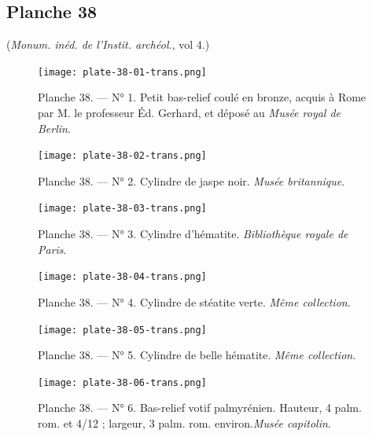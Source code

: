 \documentclass[a4paper, 11pt, oneside, polutonikogreek, french]{article}
\begin{document}
\subsection{Planche 38}
\begin{center}
(\emph{Monum. inéd. de l'Instit. archéol.}, vol 4.)
\end{center}
\vspace*{\fill}
\clearpage
\pagestyle{fancy}
\fancyhf{}
\cfoot{{\scriptsize\bfseries\thepage}}
\vspace*{\fill}
\begin{figure}[H]
\centering
\texttt{[image: plate-38-01-trans.png]}
\caption{\scriptsize Planche 38. --- N° 1. Petit bas-relief coulé en bronze, acquis à Rome par M. le professeur Éd. Gerhard, et déposé au \emph{Musée royal de Berlin}.}
\end{figure}
\vspace*{\fill}
\clearpage
\vspace*{\fill}
\begin{figure}[H]
\centering
\texttt{[image: plate-38-02-trans.png]}
\caption{\scriptsize Planche 38. --- N° 2. Cylindre de jaspe noir. \emph{Musée britannique}.}
\end{figure}
\vspace*{\fill}
\clearpage
\vspace*{\fill}
\begin{figure}[H]
\centering
\texttt{[image: plate-38-03-trans.png]}
\caption{\scriptsize Planche 38. --- N° 3. Cylindre d'hématite. \emph{Bibliothèque royale de Paris}.}
\end{figure}
\vspace*{\fill}
\clearpage
\vspace*{\fill}
\begin{figure}[H]
\centering
\texttt{[image: plate-38-04-trans.png]}
\caption{\scriptsize Planche 38. --- N° 4. Cylindre de stéatite verte. \emph{Même collection}.}
\end{figure}
\vspace*{\fill}
\clearpage
\vspace*{\fill}
\begin{figure}[H]
\centering
\texttt{[image: plate-38-05-trans.png]}
\caption{\scriptsize Planche 38. --- N° 5. Cylindre de belle hématite. \emph{Même collection}.}
\end{figure}
\vspace*{\fill}
\clearpage
\vspace*{\fill}
\begin{figure}[H]
\centering
\texttt{[image: plate-38-06-trans.png]}
\caption[Planche 38. --- N° 6. Bas-relief votif palmyrénien. Hauteur, 4 palm. rom. et 4/12 ; largeur, 3 palm. rom. environ. \emph{Musée capitolin}.]{\scriptsize Planche 38. --- N° 6. Bas-relief votif palmyrénien. Hauteur, 4 palm. rom. et 4/12 ; largeur, 3 palm. rom. environ.\footnotemark \emph{Musée capitolin}.}
\end{figure}
\end{document}
